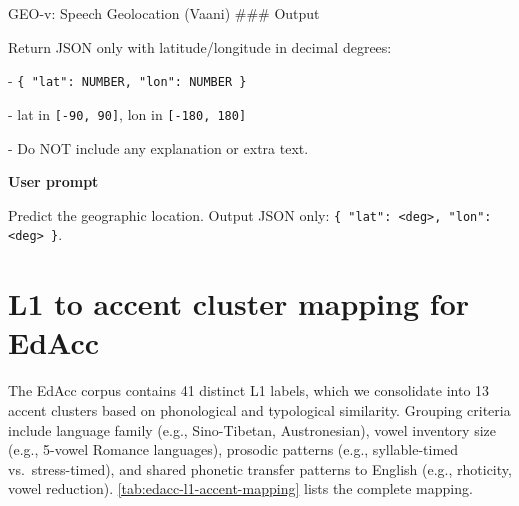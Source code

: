 {\begin{promptbox}{GEO-v: Speech Geolocation (Vaani)}
\noindent\#\#\# Output
\par
Return JSON only with latitude/longitude in decimal degrees:
\par
\hspace*{1em}- \texttt{\{ "lat": NUMBER, "lon": NUMBER \}}\par
\hspace*{1em}- lat in \texttt{[-90, 90]}, lon in \texttt{[-180, 180]}\par
\hspace*{1em}- Do NOT include any explanation or extra text.
\par\vspace{2pt}

\textbf{User prompt}\par\vspace{2pt}
\noindent
Predict the geographic location. Output JSON only: \texttt{\{ "lat": <deg>, "lon": <deg> \}}.
\end{promptbox}

\ifdefined\linenumbers\linenumbers\fi
}



\section{L1 to accent cluster mapping for EdAcc}
The EdAcc corpus contains 41 distinct L1 labels, which we consolidate into 13 accent clusters based on phonological and typological similarity.
Grouping criteria include language family (e.g., Sino-Tibetan, Austronesian), vowel inventory size (e.g., 5-vowel Romance languages), prosodic patterns (e.g., syllable-timed vs.\ stress-timed), and shared phonetic transfer patterns to English (e.g., rhoticity, vowel reduction).
\autoref{tab:edacc-l1-accent-mapping} lists the complete mapping.

